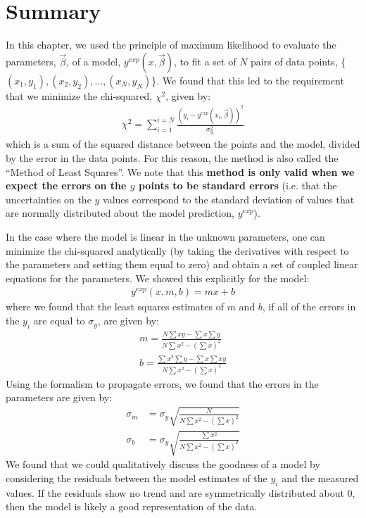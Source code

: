 
\section{Summary}
\begin{chapterSummary}
In this chapter, we used the principle of maximum likelihood to evaluate the parameters, $\vec\beta$, of a model, $y^{exp}(x,\vec\beta)$, to fit a set of $N$ pairs of data points, \{$(x_1,y_1), (x_2,y_2), \dots, (x_N,y_N)$\}. We found that this led to the requirement that we minimize the chi-squared, $\chi^2$, given by:
\begin{align}
\chi^2=\sum_{i=1}^{i=N}\frac{(y_i-y^{exp}(x_i,\vec\beta))^2}{\sigma_{y_i}^2}
\end{align}
which is a sum of the squared distance between the points and the model, divided by the error in the data points. For this reason, the method is also called the ``Method of Least Squares''. We note that this \textbf{method is only valid when we expect the errors on the $y$ points to be standard errors} (i.e. that the uncertainties on the $y$ values correspond to the standard deviation of values that are normally distributed about the model prediction, $y^{exp}$).

In the case where the model is linear in the unknown parameters, one can minimize the chi-squared analytically (by taking the derivatives with respect to the parameters and setting them equal to zero) and obtain a set of coupled linear equations for the parameters. We showed this explicitly for the model:
\begin{align}
y^{exp}(x,m,b)=mx+b
\end{align}
where we found that the least squares estimates of $m$ and $b$, if all of the errors in the $y_i$ are equal to $\sigma_y$, are given by:
\begin{align}
m=\frac{N\sum xy-\sum x\sum y}{N\sum x^2-\left(\sum x\right)^2}\nonumber\\
b=\frac{\sum x^2\sum y-\sum x \sum xy}{N\sum x^2-\left(\sum x\right)^2}
\end{align}
Using the formalism to propagate errors, we found that the errors in the parameters are given by:
\begin{align}
\sigma_m&=\sigma_y\sqrt{\frac{N}{N\sum x^2-\left(\sum x\right)^2}}\nonumber\\
\sigma_b&=\sigma_y\sqrt{\frac{\sum x^2}{N\sum x^2-\left(\sum x\right)^2}}
\end{align}
We found that we could qualitatively discuss the goodness of a model by considering the residuals between the model estimates of the $y_i$ and the measured values. If the residuals show no trend and are symmetrically distributed about 0, then the model is likely a good representation of the data.


\end{chapterSummary}
